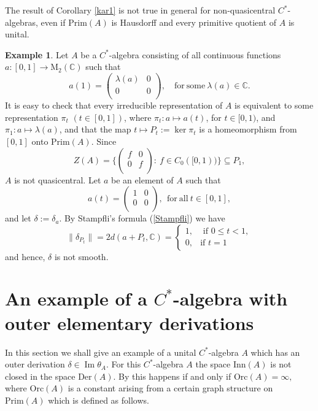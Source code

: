 \documentclass[]{amsart}
\theoremstyle{remark}
\theoremstyle{definition}
\newtheorem{example}[theorem]{Example}
\theoremstyle{question}
\numberwithin{equation}{section}
\begin{document}
The result of Corollary \ref{kar1} is not true in general for non-quasicentral
$C^*$-algebras, even if $\mathrm{Prim}(A)$ is Hausdorff and
every primitive quotient of $A$ is unital.
\begin{example} Let $A$ be a $C^*$-algebra consisting of all continuous functions
$a : [0,1] \to {\mathrm{M}}_2({\mathbb{C}})$ such that $$a(1)=\left( \begin{array}{cc}
               \lambda(a) & 0 \\
              0 & 0 \\
               \end{array} \right), \quad \mathrm{for} \ \mathrm{some} \
\lambda(a) \in {\mathbb{C}}. $$
It is easy to check that every irreducible representation of $A$ is equivalent
to some representation $\pi_t$ $(t \in [0,1])$, where $\pi_t : a \mapsto a(t)$,
for $t \in  [0,1)$, and $\pi_1 : a \mapsto\lambda(a)$, and that
the map $t \mapsto P_t:=\ker\pi_t$ is a homeomorphism from $[0,1]$ onto
$\mathrm{Prim}(A)$. Since
$$Z(A)=\Big \{\left( \begin{array}{cc}
               f & 0 \\
              0 & f \\
               \end{array} \right) : \ f \in C_0([0,1)) \Big\} \subseteq P_1,$$
$A$ is not quasicentral. Let $a$ be an element of $A$ such that
$$a(t)=\left( \begin{array}{cc}
               1 & 0 \\
              0 & 0 \\
               \end{array} \right), \ \ \mathrm{for} \ \mathrm{all} \ t \in [0,1],$$
and let $\delta:=\delta_a$.
By Stampfli's formula (\ref{Stampfli}) we have
$$\|\delta_ {P_t}\|=2d(a+P_t,{\mathbb{C}})=\left\{\begin{array}{cl}
1, & \textrm{ if } 0\leq t  <1 ,\\
0, & \textrm{if } t=1
\end{array}\right.$$
and hence, $\delta$ is not smooth.

\end{example}

\section{An example of a $C^*$-algebra with outer elementary derivations}

In this section we shall give an example of a unital $C^*$-algebra $A$ which has
an outer derivation $\delta \in {\mathop{\mathrm{Im}}} \theta_A$. For this $C^*$-algebra $A$ the
space $\mathrm{Inn}(A)$ is not closed in the space $\mathrm{Der}(A)$.
By \cite[4.6]{Som3} this happens if and only if $\mathrm{Orc}(A)=\infty,$ where
$\mathrm{Orc}(A)$ is a constant arising from a certain graph structure on
$\mathrm{Prim}(A)$ which is defined as follows.
\end{document}
